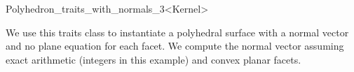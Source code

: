 \begin{ccRefClass}{Polyhedron_traits_with_normals_3<Kernel>}

\ccSeeAlso


\ccExample

We use this traits class to instantiate a polyhedral surface with a
normal vector and no plane equation for each facet. We compute the
normal vector assuming exact arithmetic (integers in this example)
and convex planar facets.


\end{ccRefClass}

\ccRefPageEnd

